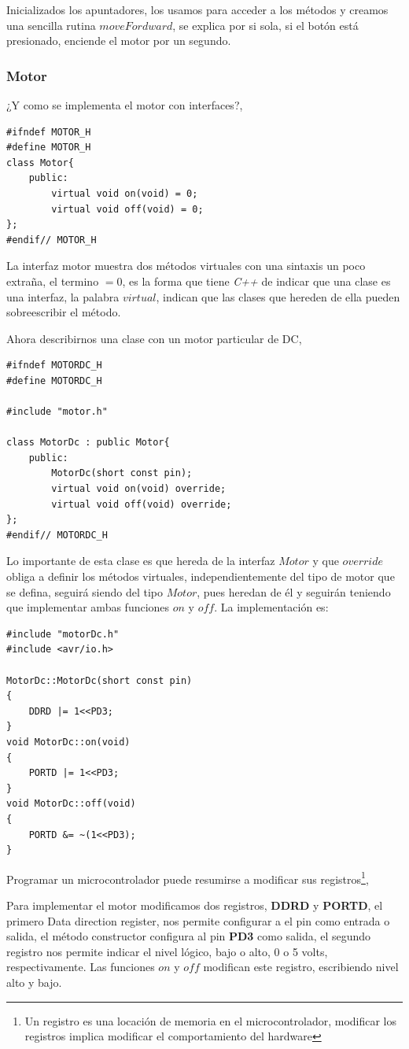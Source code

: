 Inicializados los apuntadores, los usamos para acceder a los métodos y creamos una 
sencilla rutina $moveFordward$, se explica por si sola, si el botón está 
presionado, enciende el motor por un segundo.
\subsubsection{Motor}
¿Y como se implementa el motor con interfaces?,
\begin{verbatim}
#ifndef MOTOR_H
#define MOTOR_H
class Motor{
	public: 
		virtual void on(void) = 0;
		virtual void off(void) = 0;
};
#endif// MOTOR_H
\end{verbatim}

La interfaz motor muestra dos métodos virtuales con una sintaxis un poco extraña,
el termino $= 0$, es la forma que tiene \emph{C++} de indicar que una clase es una
interfaz, la palabra $virtual$, indican que las clases que hereden de ella pueden
sobreescribir el método.

Ahora describirnos una clase con un motor particular de DC,
\begin{verbatim}
#ifndef MOTORDC_H
#define MOTORDC_H

#include "motor.h"

class MotorDc : public Motor{
	public:
		MotorDc(short const pin);
		virtual void on(void) override;
		virtual void off(void) override;
};
#endif// MOTORDC_H
\end{verbatim}

Lo importante de esta clase es que hereda de la interfaz $Motor$ y que $override$
obliga a definir los  métodos virtuales, 
independientemente del tipo de motor que se defina, seguirá 
siendo del tipo $Motor$, pues heredan de él y seguirán teniendo que 
implementar ambas funciones $on$ y $off$. La implementación es:

\begin{verbatim}
#include "motorDc.h"
#include <avr/io.h>

MotorDc::MotorDc(short const pin)
{
	DDRD |= 1<<PD3;
}
void MotorDc::on(void)
{
	PORTD |= 1<<PD3;
}
void MotorDc::off(void)
{
	PORTD &= ~(1<<PD3);
}
\end{verbatim}

Programar un microcontrolador puede resumirse a modificar sus registros\footnote{
Un registro es una locación de memoria en el microcontrolador, modificar los 
registros implica modificar el comportamiento del hardware}, 

Para implementar el motor modificamos dos registros, \textbf{DDRD} y \textbf{PORTD},
el primero Data direction register, nos permite configurar a el pin como entrada
o salida, el método constructor configura al pin \textbf{PD3} como salida, el 
segundo registro nos permite indicar el nivel lógico, bajo o alto, 0 o 5 volts, 
respectivamente. Las funciones $on$ y $off$ modifican este registro, escribiendo
nivel alto y bajo.

